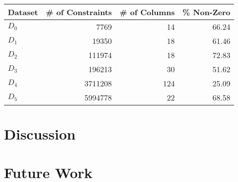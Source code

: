 \documentclass[a4paper]{article}
\begin{document}
\begin{tabular}{|l|r|r|r|}
\toprule
Dataset &  \# of Constraints &  \# of Columns &  \% Non-Zero \\
\midrule
         $D_0$ &                   7769 &                 14 &         66.24 \\
         $D_1$ &                  19350 &                 18 &         61.46 \\
         $D_2$ &                 111974 &                 18 &         72.83 \\
         $D_3$ &                 196213 &                 30 &         51.62 \\
         $D_4$ &                3711208 &                124 &         25.09 \\
         $D_5$ &                5994778 &                 22 &         68.58 \\
\bottomrule
\end{tabular}


\section{Discussion}
\section{Future Work}




\end{document}

